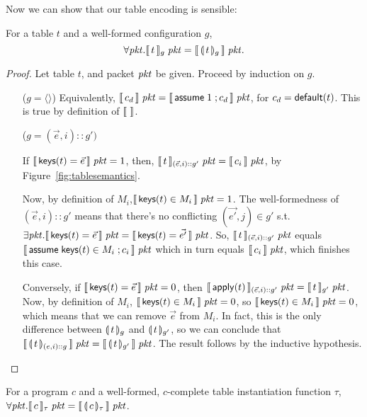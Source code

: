 Now we can show that our table encoding is sensible:

\begin{lemma}
  \label{lem:table-encoding}
  For a table $t$ and a well-formed configuration $g$,
  \[\forall \mathit{pkt}. \llbracket\,t\,\rrbracket_{g}\; \mathit{pkt} = \llbracket\,\llparenthesis\, t\, \rrparenthesis_g\,\rrbracket\;
  \mathit{pkt}.\]

\end{lemma}

\begin{proof}
  Let table $t$, and packet $\mathit{pkt}$ be given. Proceed by induction on
  $g$.
  \begin{enumerate}[align=left]
  \item[($g = \langle \rangle$)] Equivalently,
    $\llbracket\,c_d\,\rrbracket\;\mathit{pkt} = \llbracket\,\mathsf{assume}\; 1\;; c_d\,\rrbracket\; \mathit{pkt}$, for
    $c_d = \mathsf{default}(t)$. This is true by definition of $\llbracket\,\,\rrbracket$.

  \item[($g = (\vec e,i)::g')$] 
    
    If $\llbracket\,\mathsf{keys}(t) = \vec e\,\rrbracket\; \mathit{pkt} = 1$, then,
    $\llbracket\,t\,\rrbracket_{(\vec e, i)::g'}\;\mathit{pkt} = \llbracket\,c_i\,\rrbracket\; \mathit{pkt}$, by
    Figure~\ref{fig:tablesemantics}.

    Now, by definition of $M_i$,$\llbracket\,\mathsf{keys}(t) \in M_i\,\rrbracket\; \mathit{pkt} =
    1$. The well-formedness of $(\vec e, i)::g'$ means that there's no
    conflicting $(\vec{e'}, j) \in g'$ s.t.
    $\exists \mathit{pkt}. \llbracket\,\mathsf{keys}(t) = \vec{e}\,\rrbracket\; \mathit{pkt} = \llbracket\,\mathsf{keys}(t)
      = \vec{e'}\,\rrbracket\; \mathit{pkt}$.  So, $\llbracket\,t\,\rrbracket_{(\vec e,i)::g'}\; \mathit{pkt}$
    equals $\llbracket\,\mathsf{assume}\; \mathsf{keys}(t) \in M_i\;; c_i\,\rrbracket\;\mathit{pkt}$ which in
    turn equals $\llbracket\,c_i\,\rrbracket\; \mathit{pkt}$, which finishes this case.
    
    Conversely, if $\llbracket\,\mathsf{keys}(t) = \vec e\,\rrbracket\; \mathit{pkt} = 0$, then
    $\llbracket\,\mathsf{apply}(t)\,\rrbracket_{(\vec e, i)::g'}\;\mathit{pkt} =
    \llbracket\,t\,\rrbracket_{g'}\;\mathit{pkt}$.  Now, by definition of $M_i$,
    $\llbracket\,\mathsf{keys}(t) \in M_i\,\rrbracket\; \mathit{pkt} = 0$, so
    $\llbracket\,\mathsf{keys}(t) \in M_i\,\rrbracket\; \mathit{pkt} = 0$, which means that we can
    remove $\vec e$ from $M_i$. In fact, this is the only difference
    between $\llparenthesis\, t\, \rrparenthesis_{g}$ and $\llparenthesis\, t\, \rrparenthesis_{g'}$, so we can conclude
    that
    $\llbracket\,\llparenthesis\, t\, \rrparenthesis_{(e,i)::g}\,\rrbracket\;\mathit{pkt} =
    \llbracket\,\llparenthesis\, t\, \rrparenthesis_{g'}\,\rrbracket\;\mathit{pkt}$. The result follows by the
    inductive hypothesis.
  \end{enumerate}
  
\end{proof}

\begin{proposition}
  For a program $c$ and a well-formed, $c$-complete table
  instantiation function $\tau$,
  $\forall \mathit{pkt}. \llbracket\,c\,\rrbracket_{\tau}\;\mathit{pkt} =
  \llbracket\,\llparenthesis\, c\, \rrparenthesis_{\tau}\,\rrbracket\; \mathit{pkt}$.
\end{proposition}

